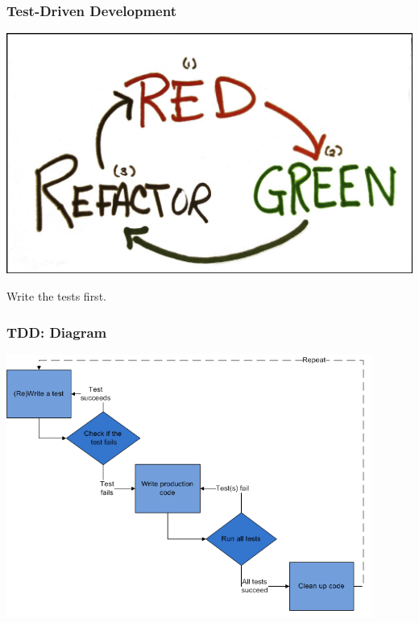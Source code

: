 \begin{frame}
\frametitle{Test-Driven Development}

\begin{center}
\includegraphics[height=.7\textheight]{images/redgreenrefactor.jpeg}
\end{center}

Write the tests first.

\end{frame}


\begin{frame}
\frametitle{TDD: Diagram}
\begin{center}
\includegraphics[width=0.9\textwidth]{images/tdd.png}
\end{center}

\end{frame}

